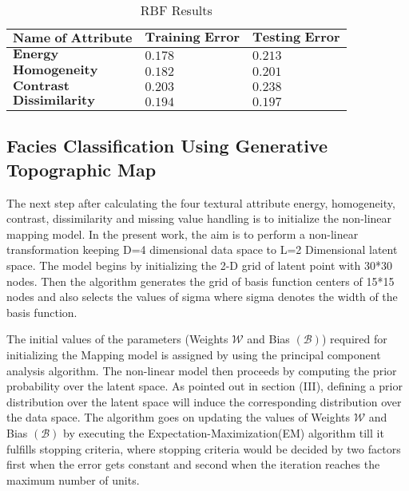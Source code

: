\documentclass[a4paper]{article}
\begin{document}
\begin{table}[htbp]
\caption{RBF Results}
\label{tab2}      
\centering
\renewcommand{\arraystretch}{1.5}
\begin{tabular}[5cm]{|p{4cm}|p{3cm}|p{3cm}|}
\hline
$\textbf{Name of Attribute}$ & $\textbf{Training Error}$ & $\textbf{Testing Error}$\\
\hline
$\textbf{Energy}$ & $0.178 $ & $0.213 $\\
\hline
$\textbf{Homogeneity}$ & $0.182 $ & $0.201 $\\
\hline
$\textbf{Contrast}$ & $0.203 $ & $0.238$\\
\hline
$\textbf{Dissimilarity}$ & $0.194 $ & $0.197 $\\
\hline
\end{tabular}
\end{table} 

\subsection{Facies Classification Using Generative Topographic Map }
  
The next step after calculating the four textural attribute energy, homogeneity, contrast, dissimilarity and missing value handling is to initialize the non-linear mapping model. In the present work, the aim is to perform a non-linear transformation keeping D=4 dimensional data space to L=2 Dimensional latent space. The model begins by initializing the 2-D grid of latent point with 30*30 nodes. Then the algorithm generates the grid of basis function centers of 15*15 nodes and also selects the values of sigma where sigma denotes the width of the basis function.

The initial values of the parameters (Weights $\mathcal{W}$ and Bias $\mathcal{(B)}$) required for initializing the Mapping model is assigned by using the principal component analysis algorithm\cite{pca}. The non-linear model then proceeds by computing the prior probability over the latent space. As pointed out in section (III), defining a prior distribution over the latent space will induce the corresponding distribution over the data space. The algorithm goes on updating the values of Weights $\mathcal{W}$ and Bias $\mathcal{(B)}$ by executing the Expectation-Maximization(EM) algorithm till it fulfills stopping criteria, where stopping criteria would be decided by two factors first when the error gets constant and second when the iteration reaches the maximum number of units.
\end{document}
